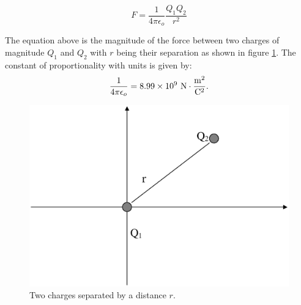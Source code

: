 \begin{equation}
F=\frac{1}{4\pi\epsilon_o}\frac{Q_1Q_2}{r^2} \label{CL}
\end{equation}

The equation above is the magnitude of the force between
two charges of magnitude $Q_1$ and $Q_2$ with $r$ being their
separation as shown in figure \ref{fig:electro:es1}.  The constant of
proportionality with units is given by:
\begin{eqnarray*}
\frac{1}{4\pi\epsilon_o}=8.99\times 10^9 ~{\rm N \cdot
\frac{m^2}{C^2}}.
\end{eqnarray*}

\begin{figure}[!htb]
\centering
\epsfxsize=6cm \includegraphics[scale=0.4]{1_electrostatics/es1.eps}
\caption{Two charges separated by a distance $r$.}
\label{fig:electro:es1}
\end{figure}

